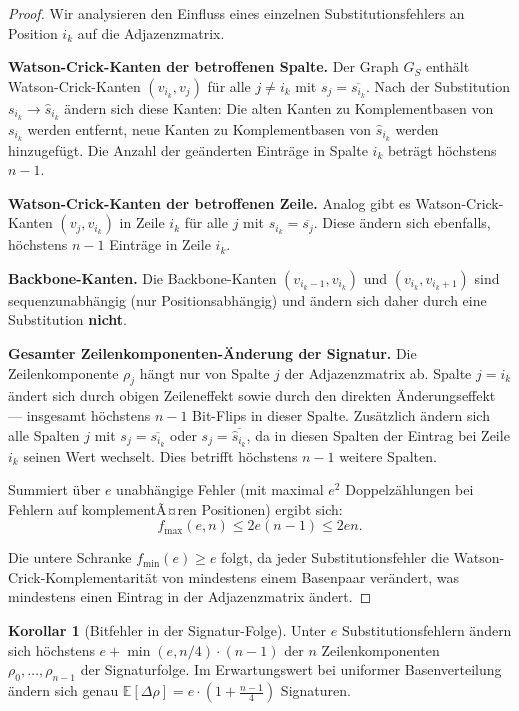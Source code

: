 ﻿\documentclass[a4paper,12pt]{article}
\theoremstyle{definition}
\newtheorem{korollar}{Korollar}
\begin{document}
\begin{proof}
    Wir analysieren den Einfluss eines einzelnen Substitutionsfehlers an
    Position $i_k$ auf die Adjazenzmatrix.

    \textbf{Watson-Crick-Kanten der betroffenen Spalte.}
    Der Graph $G_S$ enth\"{a}lt Watson-Crick-Kanten $(v_{i_k}, v_j)$ f\"{u}r
    alle $j \neq i_k$ mit $s_j = \overline{s_{i_k}}$. Nach der Substitution
    $s_{i_k} \to \hat{s}_{i_k}$ \"{a}ndern sich diese Kanten: Die alten
    Kanten zu Komplementbasen von $s_{i_k}$ werden entfernt, neue Kanten zu
    Komplementbasen von $\hat{s}_{i_k}$ werden hinzugef\"{u}gt.
    Die Anzahl der ge\"{a}nderten Eintr\"{a}ge in Spalte $i_k$ betr\"{a}gt
    h\"{o}chstens $n - 1$.

    \textbf{Watson-Crick-Kanten der betroffenen Zeile.}
    Analog gibt es Watson-Crick-Kanten $(v_j, v_{i_k})$ in Zeile $i_k$
    f\"{u}r alle $j$ mit $s_{i_k} = \overline{s_j}$. Diese \"{a}ndern sich
    ebenfalls, h\"{o}chstens $n - 1$ Eintr\"{a}ge in Zeile $i_k$.

    \textbf{Backbone-Kanten.}
    Die Backbone-Kanten $(v_{i_k - 1}, v_{i_k})$ und $(v_{i_k}, v_{i_k+1})$
    sind sequenzunabh\"{a}ngig (nur Positionsabh\"{a}ngig) und \"{a}ndern sich
    daher durch eine Substitution \textbf{nicht}.

    \textbf{Gesamter Zeilenkomponenten-\"{A}nderung der Signatur.}
    Die Zeilenkomponente $\rho_j$ h\"{a}ngt nur von Spalte $j$ der Adjazenzmatrix
    ab. Spalte $j = i_k$ \"{a}ndert sich durch obigen Zeileneffekt sowie durch
    den direkten \"{A}nderungseffekt --- insgesamt h\"{o}chstens $n-1$
    Bit-Flips in dieser Spalte. Zus\"{a}tzlich \"{a}ndern sich alle Spalten
    $j$ mit $s_j = \overline{s_{i_k}}$ oder $s_j = \overline{\hat{s}_{i_k}}$,
    da in diesen Spalten der Eintrag bei Zeile $i_k$ seinen Wert wechselt.
    Dies betrifft h\"{o}chstens $n - 1$ weitere Spalten.

    Summiert \"{u}ber $e$ unabh\"{a}ngige Fehler (mit maximal $e^2$ Doppelz\"{a}hlungen
    bei Fehlern auf komplementÃ¤ren Positionen) ergibt sich:
    \[
        f_{\max}(e, n) \leq 2e(n-1) \leq 2en.
    \]

    Die untere Schranke $f_{\min}(e) \geq e$ folgt, da jeder Substitutionsfehler
    die Watson-Crick-Komplementarit\"{a}t von mindestens einem Basenpaar
    ver\"{a}ndert, was mindestens einen Eintrag in der Adjazenzmatrix \"{a}ndert.
\end{proof}

\begin{korollar}[Bitfehler in der Signatur-Folge]
    \label{kor:signaturfehler}
    Unter $e$ Substitutionsfehlern \"{a}ndern sich h\"{o}chstens
    $e + \min(e, n/4) \cdot (n-1)$ der $n$ Zeilenkomponenten
    $\rho_0, \ldots, \rho_{n-1}$ der Signaturfolge. Im Erwartungswert
    bei uniformer Basenverteilung \"{a}ndern sich genau
    $\mathbb{E}[\Delta\rho] = e \cdot \left(1 + \frac{n-1}{4}\right)$
    Signaturen.
\end{korollar}
\end{document}
